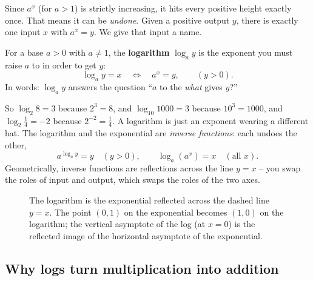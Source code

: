 Since $a^x$ (for $a>1$) is strictly increasing, it hits every positive height exactly once. That means it can be \emph{undone}. Given a positive output $y$, there is exactly one input $x$ with $a^x = y$. We give that input a name.

\begin{definition}[Logarithm]\label{ch03:def-log}
For a base $a>0$ with $a\neq 1$, the \textbf{logarithm} $\log_a y$ is the exponent you must raise $a$ to in order to get $y$:
\[
\log_a y = x \quad\Longleftrightarrow\quad a^x = y, \qquad (y>0).
\]
In words: $\log_a y$ answers the question ``$a$ to the \emph{what} gives $y$?''
\end{definition}

So $\log_2 8 = 3$ because $2^3=8$, and $\log_{10}1000=3$ because $10^3=1000$, and $\log_2 \tfrac{1}{4} = -2$ because $2^{-2}=\tfrac14$. A logarithm is just an exponent wearing a different hat. The logarithm and the exponential are \emph{inverse functions}: each undoes the other,
\[
a^{\log_a y} = y \quad (y>0), \qquad \log_a(a^x) = x \quad (\text{all } x).
\]
Geometrically, inverse functions are reflections across the line $y=x$ -- you swap the roles of input and output, which swaps the roles of the two axes.

\begin{figure}[H]
\centering
{}
\caption{The logarithm is the exponential reflected across the dashed line $y=x$. The point $(0,1)$ on the exponential becomes $(1,0)$ on the logarithm; the vertical asymptote of the log (at $x=0$) is the reflected image of the horizontal asymptote of the exponential.}
\label{ch03:fig-log-reflect}
\end{figure}

\subsection{Why logs turn multiplication into addition}

